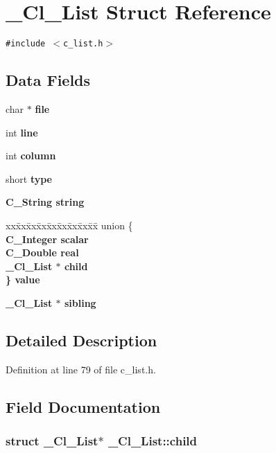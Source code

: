 \section{\_\-Cl\_\-List Struct Reference}
\label{struct__Cl__List}
{\tt \#include $<$c\_\-list.h$>$}

\subsection*{Data Fields}
\begin{CompactItemize}
\item 
char $\ast$ \bf{file}
\item 
int \bf{line}
\item 
int \bf{column}
\item 
short \bf{type}
\item 
\bf{C\_\-String} \bf{string}
\item 
\begin{tabbing}
xx\=xx\=xx\=xx\=xx\=xx\=xx\=xx\=xx\=\kill
union \{\\
\>\bf{C\_Integer} \bf{scalar}\\
\>\bf{C\_Double} \bf{real}\\
\>\bf{\_Cl\_List} $\ast$ \bf{child}\\
\} \bf{value}\\

\end{tabbing}\item 
\bf{\_\-Cl\_\-List} $\ast$ \bf{sibling}
\end{CompactItemize}


\subsection{Detailed Description}




Definition at line 79 of file c\_\-list.h.

\subsection{Field Documentation}
\subsubsection{\setlength{\rightskip}{0pt plus 5cm}struct \bf{\_\-Cl\_\-List}$\ast$ \bf{\_\-Cl\_\-List::child}}\label{struct__Cl__List_e7ceb9c1825d6e6e6c18b9b0093c9a2e}




